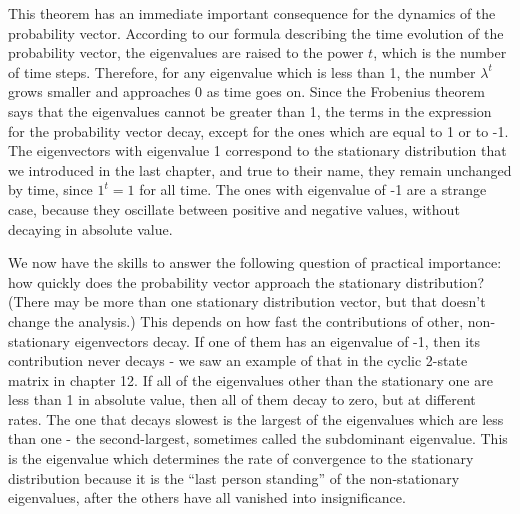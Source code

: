 \documentclass[
  letterpaper,
  DIV=11,
  numbers=noendperiod]{scrreprt}
\begin{document}
This theorem has an immediate important consequence for the dynamics of
the probability vector. According to our formula describing the time
evolution of the probability vector, the eigenvalues are raised to the
power \(t\), which is the number of time steps. Therefore, for any
eigenvalue which is less than 1, the number \(\lambda^t\) grows smaller
and approaches 0 as time goes on. Since the Frobenius theorem says that
the eigenvalues cannot be greater than 1, the terms in the expression
for the probability vector decay, except for the ones which are equal to
1 or to -1. The eigenvectors with eigenvalue 1 correspond to the
stationary distribution that we introduced in the last chapter, and true
to their name, they remain unchanged by time, since \(1^t =1\) for all
time. The ones with eigenvalue of -1 are a strange case, because they
oscillate between positive and negative values, without decaying in
absolute value.

We now have the skills to answer the following question of practical
importance: how quickly does the probability vector approach the
stationary distribution? (There may be more than one stationary
distribution vector, but that doesn't change the analysis.) This depends
on how fast the contributions of other, non-stationary eigenvectors
decay. If one of them has an eigenvalue of -1, then its contribution
never decays - we saw an example of that in the cyclic 2-state matrix in
chapter 12. If all of the eigenvalues other than the stationary one are
less than 1 in absolute value, then all of them decay to zero, but at
different rates. The one that decays slowest is the largest of the
eigenvalues which are less than one - the second-largest, sometimes
called the subdominant eigenvalue. This is the eigenvalue which
determines the rate of convergence to the stationary distribution
because it is the ``last person standing'' of the non-stationary
eigenvalues, after the others have all vanished into insignificance.
\end{document}
